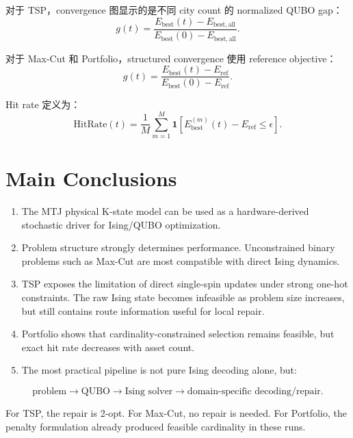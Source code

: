 \documentclass[UTF8]{ctexart}
\begin{document}
对于 TSP，convergence 图显示的是不同 city count 的 normalized QUBO gap：
\begin{equation}
g(t)
=
\frac{
E_{\mathrm{best}}(t)-E_{\mathrm{best,all}}
}{
E_{\mathrm{best}}(0)-E_{\mathrm{best,all}}
}.
\end{equation}

对于 Max-Cut 和 Portfolio，structured convergence 使用 reference objective：
\begin{equation}
g(t)
=
\frac{
E_{\mathrm{best}}(t)-E_{\mathrm{ref}}
}{
E_{\mathrm{best}}(0)-E_{\mathrm{ref}}
}.
\end{equation}

Hit rate 定义为：
\begin{equation}
\mathrm{HitRate}(t)
=
\frac{1}{M}
\sum_{m=1}^{M}
\mathbf{1}
\left[
E_{\mathrm{best}}^{(m)}(t)
-E_{\mathrm{ref}}
\le
\epsilon
\right].
\end{equation}

\section{Main Conclusions}

\begin{enumerate}[leftmargin=2em]
    \item The MTJ physical K-state model can be used as a hardware-derived stochastic driver for Ising/QUBO optimization.
    \item Problem structure strongly determines performance. Unconstrained binary problems such as Max-Cut are most compatible with direct Ising dynamics.
    \item TSP exposes the limitation of direct single-spin updates under strong one-hot constraints. The raw Ising state becomes infeasible as problem size increases, but still contains route information useful for local repair.
    \item Portfolio shows that cardinality-constrained selection remains feasible, but exact hit rate decreases with asset count.
    \item The most practical pipeline is not pure Ising decoding alone, but:
\end{enumerate}

\begin{equation}
\text{problem}
\rightarrow
\text{QUBO}
\rightarrow
\text{Ising solver}
\rightarrow
\text{domain-specific decoding/repair}.
\end{equation}

For TSP, the repair is 2-opt. For Max-Cut, no repair is needed. For Portfolio, the penalty formulation already produced feasible cardinality in these runs.
\end{document}
